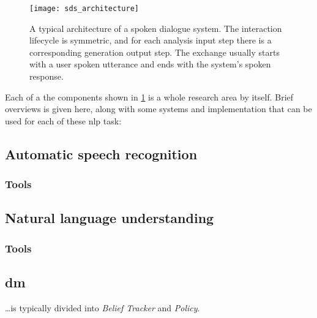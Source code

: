 
\begin{figure}[t]
	\centering
	\texttt{[image: sds\_architecture]}
	\caption[Architecture of a spoken dialogue system] {
		A typical architecture of a spoken dialogue system.
		The interaction lifecycle is symmetric, and for each analysis input step there is a corresponding generation output step.
		The exchange usually starts with a user spoken utterance and ends with the system's spoken response.
	}
	\label{fig:sds_architecture}
\end{figure}

Each of a the components shown in \cref{fig:sds_architecture} is a whole research area by itself.
Brief overviews is given here, along with some systems and implementation that can be used for each of these \ac{nlp} task:

\subsection{Automatic speech recognition}
\label{subsec:automatic_speech_recognition}

\subsubsection{Tools}
\label{subsubsec:tools_asr}

\subsection{Natural language understanding}
\label{subsec:natural_language_understanding}


\subsubsection{Tools}
\label{subsubsec:tools_nlu}

\subsection{\Acl{dm}}
\label{subsec:dialogue_management}

\ldots is typically divided into \emph{Belief Tracker} and \emph{Policy}.

